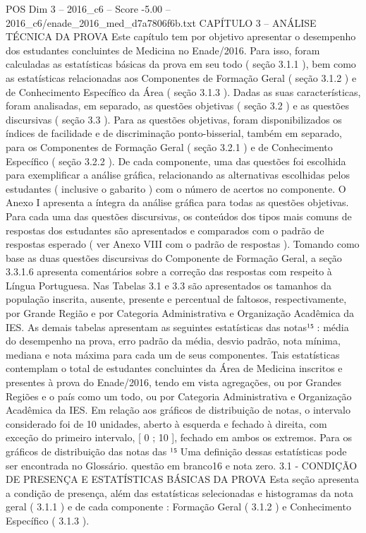 \begin{textsample}{POS Dim 3 – 2016\_c6 – Score -5.00 – 2016\_c6/enade\_2016\_med\_d7a7806f6b.txt}  \label{ex:f3_pos_252}
CAPÍTULO 3 – ANÁLISE TÉCNICA DA PROVA Este capítulo tem por objetivo apresentar o desempenho dos estudantes concluintes de Medicina no Enade/2016.
Para isso, foram calculadas as estatísticas básicas da prova em seu todo ( seção 3.1.1 ), bem como as estatísticas relacionadas aos Componentes de Formação Geral ( seção 3.1.2 ) e de Conhecimento Específico da Área ( seção 3.1.3 ).
Dadas as suas características, foram analisadas, em separado, as questões objetivas ( seção 3.2 ) e as questões discursivas ( seção 3.3 ).
Para as questões objetivas, foram disponibilizados os índices de facilidade e de discriminação ponto-bisserial, também em separado, para os Componentes de Formação Geral ( seção 3.2.1 ) e de Conhecimento Específico ( seção 3.2.2 ).
De cada componente, uma das questões foi escolhida para exemplificar a análise gráfica, relacionando as alternativas escolhidas pelos estudantes ( inclusive o gabarito ) com o número de acertos no componente.
O Anexo I apresenta a íntegra da análise gráfica para todas as questões objetivas.
Para cada uma das questões discursivas, os conteúdos dos tipos mais comuns de respostas dos estudantes são apresentados e comparados com o padrão de respostas esperado ( ver Anexo VIII com o padrão de respostas ).
Tomando como base as duas questões discursivas do Componente de Formação Geral, a seção 3.3.1.6 apresenta comentários sobre a correção das respostas com respeito à Língua Portuguesa.
Nas Tabelas 3.1 e 3.3 são apresentados os tamanhos da população inscrita, ausente, presente e percentual de faltosos, respectivamente, por Grande Região e por Categoria Administrativa e Organização Acadêmica da IES.
As demais tabelas apresentam as seguintes estatísticas das notas¹⁵ : média do desempenho na prova, erro padrão da média, desvio padrão, nota mínima, mediana e nota máxima para cada um de seus componentes.
Tais estatísticas contemplam o total de estudantes concluintes da Área de Medicina inscritos e presentes à prova do Enade/2016, tendo em vista agregações, ou por Grandes Regiões e o país como um todo, ou por Categoria Administrativa e Organização Acadêmica da IES.
Em relação aos gráficos de distribuição de notas, o intervalo considerado foi de 10 unidades, aberto à esquerda e fechado à direita, com exceção do primeiro intervalo, [ 0 ; 10 ], fechado em ambos os extremos.
Para os gráficos de distribuição das notas das ¹⁵ Uma definição dessas estatísticas pode ser encontrada no Glossário. questão em branco16 e nota zero. 3.1 - CONDIÇÃO DE PRESENÇA E ESTATÍSTICAS BÁSICAS DA PROVA Esta seção apresenta a condição de presença, além das estatísticas selecionadas e histogramas da nota geral ( 3.1.1 ) e de cada componente : Formação Geral ( 3.1.2 ) e Conhecimento Específico ( 3.1.3 ).

\end{textsample}
